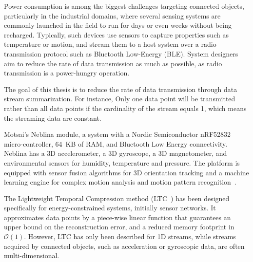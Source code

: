 Power consumption is among the biggest challenges targeting connected  objects,
particularly in the industrial domains, where several sensing  systems are
commonly launched in the field to run for days or even  weeks without being
recharged. Typically, such devices use sensors to  capture properties such as
temperature or motion, and stream them to a  host system over a radio
transmission protocol such as Bluetooth  Low-Energy (BLE). System designers aim
to reduce the rate of data  transmission as much as possible, as radio
transmission is a  power-hungry operation.



The goal of this thesis is to reduce the rate of data transmission through data
stream summarization. For instance, Only one data point will be transmitted
rather than all data points if the cardinality of the stream equals 1, which
means the streaming data are constant.


Motsai's Neblina module, a system with a Nordic Semiconductor nRF52832
micro-controller, 64~KB of RAM,  and Bluetooth Low Energy connectivity. Neblina
has a 3D  accelerometer, a 3D gyroscope, a 3D magnetometer, and environmental
sensors for humidity, temperature and pressure. The platform is  equipped with
sensor fusion algorithms for 3D orientation tracking and  a machine learning
engine for complex motion analysis and motion  pattern
recognition~\cite{sarbishei2016accuracy}.







The Lightweight Temporal Compression method 
(LTC~\cite{schoellhammer2004lightweight}) has been designed 
specifically for energy-constrained systems, initially sensor networks. 
It approximates data points by a piece-wise linear function that 
guarantees an upper bound on the reconstruction error, and a reduced 
memory footprint in $\mathcal{O}(1)$. However, LTC has only been 
described for 1D streams, while streams acquired by connected objects, such as 
acceleration or gyroscopic data, are often multi-dimensional. 



